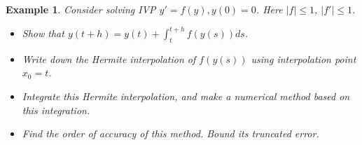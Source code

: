 \documentclass[20pt]{article} %
\theoremstyle{break}
\newtheorem{exa}[definition]{Example}
\begin{document}
\newpage

\begin{exa}Consider solving IVP $y'=f(y), y(0)=0$. Here $|f|\leq 1$, $|f'|\leq 1$.
  \begin{itemize}
   \item Show that $y(t+h)=y(t)+\int_t^{t+h}f(y(s))ds$.
   \item Write down the Hermite interpolation of $f(y(s))$ using interpolation point $x_0=t$.
   \item Integrate this Hermite interpolation, and make a numerical method based on this integration.
   \item Find the order of accuracy of this method. Bound its truncated error.
  \end{itemize}

\end{exa}
\end{document}
